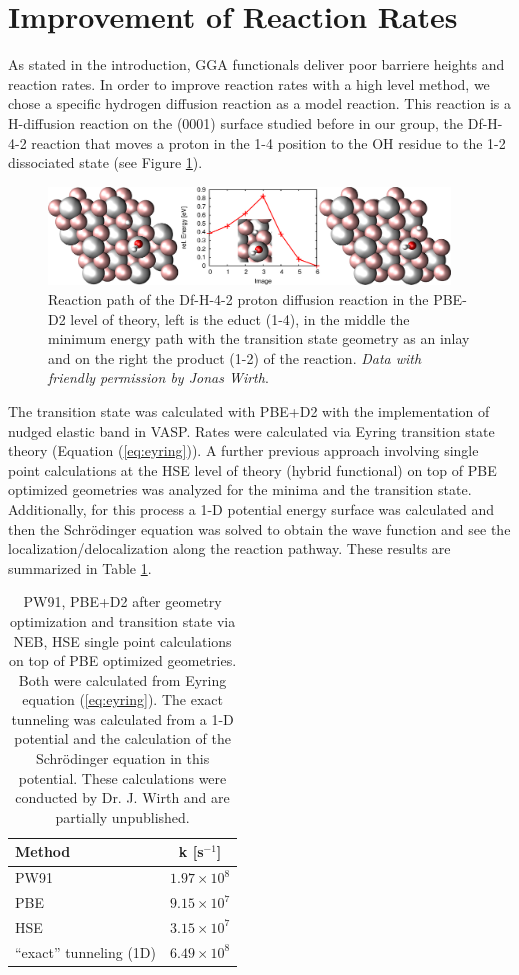 \documentclass[11pt,DIV=13,BCOR=5mm,a4paper,headinclude]{scrbook}
\begin{document}
\section{Improvement of Reaction Rates}\label{crystal_calc}
As stated in the introduction, GGA functionals deliver poor barriere heights and reaction rates.
In order to improve reaction rates with a high level method, we chose a specific hydrogen diffusion reaction as a model reaction.
This reaction is a H-diffusion reaction on the (0001) surface studied before in our group, the Df-H-4-2 reaction\cite{WirthJPCC2012} that moves a proton in the 1-4 position to the OH residue to the 1-2 dissociated state (see Figure \ref{abb:df-h-4-2}).
\begin{figure}[h]
\centering
\includegraphics[width=0.95\textwidth]{figures/0001/NEB-path/df-h-4-2.pdf}
\caption{Reaction path of the Df-H-4-2 proton diffusion reaction in the PBE-D2 level of theory, left is the educt (1-4), in the middle the minimum energy path with the transition state geometry as an inlay and on the right the product (1-2) of the reaction.
\textit{Data with friendly permission by Jonas Wirth}.}
       \label{abb:df-h-4-2}
\end{figure}
The transition state was calculated with PBE+D2 with the implementation of nudged elastic band in VASP.
Rates were calculated via Eyring transition state theory (Equation (\ref{eq:eyring})).
A further previous approach involving single point calculations at the HSE level of theory (hybrid functional) on top of PBE optimized geometries was analyzed for the minima and the transition state.
Additionally, for this process a 1-D potential energy surface was calculated and then the Schrödinger equation was solved to obtain the wave function and see the localization/delocalization along the reaction pathway.
These results are summarized in Table \ref{tab:4-2results_jonas}.
\begin{table}[!h]
  \centering
  \caption{PW91, PBE+D2 after geometry optimization and transition state via NEB, HSE single point calculations on top of PBE optimized geometries.
Both were calculated from Eyring equation (\ref{eq:eyring}).
The exact tunneling was calculated from a 1-D potential and the calculation of the Schrödinger equation in this potential.
These calculations were conducted by Dr. J. Wirth and are partially unpublished.}
\hspace*{-1cm}
 \begin{tabular}{l|c}
 \toprule
 Method&k [s$^{-1}$] \\
    \midrule
 PW91 & $1.97\times 10^8$\\
 PBE & $9.15\times 10^7$\\
 HSE & $3.15\times 10^7$\\
 ``exact'' tunneling (1D) & $6.49\times 10^8$\\\bottomrule
  \end{tabular}
  \label{tab:4-2results_jonas}
\end{table}
\end{document}
